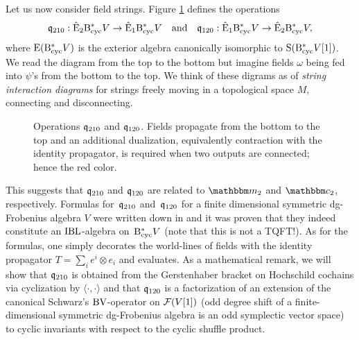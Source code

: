 \documentclass[\MainFolder/Text.tex]{subfiles}
\begin{document}
Let us now consider field strings. Figure \ref{Fig:OpCoOpDiag} defines the operations
\[ \mathfrak{q}_{210}: \hat{\mathrm{E}}_2 \mathrm{B}_{\mathrm{cyc}}^* V \rightarrow \hat{\mathrm{E}}_1\mathrm{B}_{\mathrm{cyc}}^* V \quad\text{and}\quad \mathfrak{q}_{120}: \hat{\mathrm{E}}_1\mathrm{B}_{\mathrm{cyc}}^* V \rightarrow \hat{\mathrm{E}}_2\mathrm{B}_{\mathrm{cyc}}^* V, \]
where $\mathrm{E}(\mathrm{B}_{\mathrm{cyc}}^* V)$ is the exterior algebra canonically isomorphic to $\mathrm{S}(\mathrm{B}_{\mathrm{cyc}}^* V [1])$. We read the diagram from the top to the bottom but imagine fields $\omega$ being fed into $\psi$'s from the bottom to the top. We think of these digrams as of \emph{string interaction diagrams} for strings freely moving in a topological space $M$, connecting and disconnecting.
\begin{figure}[t]
\centering
 
 \caption[Operations $\OPQ_{210}$ and $\OPQ_{120}$.]{Operations $\OPQ_{210}$ and $\OPQ_{120}$. Fields propagate from the bottom to the top and an additional dualization, equivalently contraction with the identity propagator, is required when two outputs are connected; hence the red color.}
 \label{Fig:OpCoOpDiag}
\end{figure}
%
This suggests that $\OPQ_{210}$ and $\OPQ_{120}$ are related to $\StringOp_2$ and $\StringCoOp_2$, respectively. Formulas for~$\OPQ_{210}$ and~$\OPQ_{120}$ for a finite dimensional symmetric dg-Frobenius algebra $V$ were written down in \cite{Cieliebak2015} and it was proven that they indeed constitute an $\mathrm{IBL}$-algebra on~$\mathrm{B}_{\mathrm{cyc}}^* V$ (note that this is not a TQFT!). As for the formulas, one simply decorates the world-lines of fields with the identity propagator $T = \sum_i e^i \otimes e_i$ and evaluates. As a mathematical remark, we will show that $\OPQ_{210}$ is obtained from the Gerstenhaber bracket on Hochschild cochains via cyclization by $\langle\cdot,\cdot\rangle$ and that $\OPQ_{120}$  is a factorization of an extension of the canonical Schwarz's $\mathrm{BV}$-operator on $\mathcal{F}(V[1])$ (odd degree shift of a finite-dimensional symmetric dg-Frobenius algebra is an odd symplectic vector space) to cyclic invariants with respect to the cyclic shuffle product.
\end{document}
